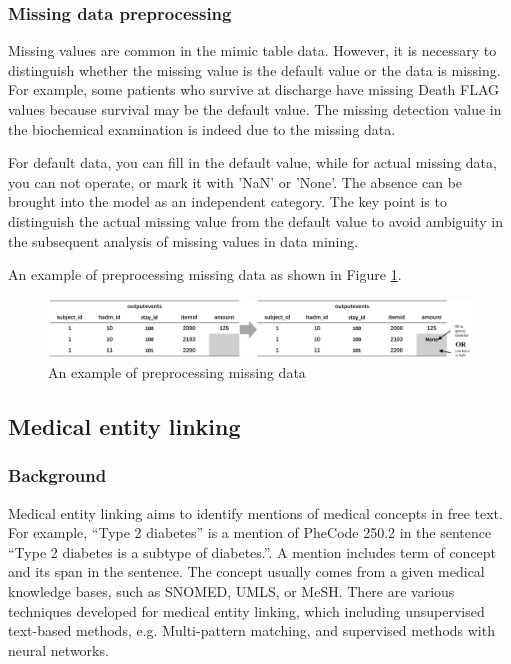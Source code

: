 \subsubsection{Missing data preprocessing}
Missing values are common in the mimic table data. However, it is necessary to distinguish whether the missing value is the default value or the data is missing. For example, some patients who survive at discharge have missing Death FLAG values because survival may be the default value. The missing detection value in the biochemical examination is indeed due to the missing data.

For default data, you can fill in the default value, while for actual missing data, you can not operate, or mark it with 'NaN' or 'None'. The absence can be brought into the model as an independent category. The key point is to distinguish the actual missing value from the default value to avoid ambiguity in the subsequent analysis of missing values in data mining.

An example of preprocessing missing data as shown in Figure \ref{fig:MIMIC_missing_preprocessing}.

\begin{figure}[ht]
    \centering
    \includegraphics[width=1\linewidth]{images/MIMIC_missing_preprocessing.png}
    \caption{An example of preprocessing missing data}
    \label{fig:MIMIC_missing_preprocessing}
\end{figure}

\subsection{Medical entity linking}%

\subsubsection{Background}

Medical entity linking aims to identify mentions of medical concepts in free text. For example, ``Type 2 diabetes'' is a mention of PheCode 250.2 in the sentence ``Type 2 diabetes is a subtype of diabetes.''. A mention includes term of concept and its span in the sentence. The concept usually comes from a given medical knowledge bases, such as SNOMED, UMLS, or MeSH. There are various techniques developed for medical entity linking, which including unsupervised text-based methods, e.g. Multi-pattern matching, and supervised methods with neural networks.

